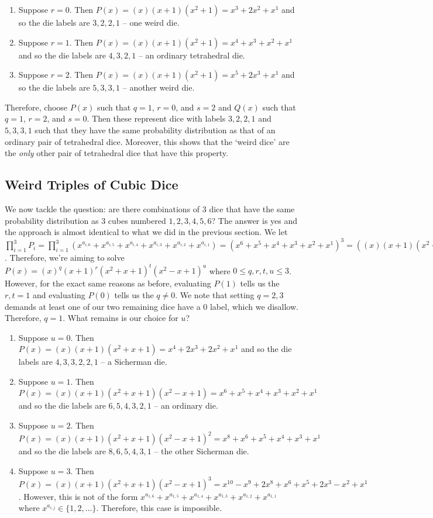 \documentclass[12pt]{report}
\begin{document}
\begin{enumerate}
\item Suppose $r=0$. Then $P(x)=(x)(x+1)(x^{2}+1)=x^{3}+2x^{2}+x^{1}$ and so the die labels are $3,2,2,1$ -- one weird die.
\item Suppose $r=1$. Then $P(x)=(x)(x+1)(x^{2}+1)=x^{4}+x^{3}+x^{2}+x^{1}$ and so the die labels are $4,3,2,1$ -- an ordinary tetrahedral die.
\item Suppose $r=2$. Then $P(x)=(x)(x+1)(x^{2}+1)=x^{5}+2x^{3}+x^{1}$ and so the die labels are $5,3,3,1$ -- another weird die.
\end{enumerate}

Therefore, choose $P(x)$ such that $q=1$, $r=0$, and $s=2$ and $Q(x)$ such that $q=1$, $r=2$, and $s=0$. Then
these represent dice with labels $3,2,2,1$ and $5,3,3,1$ such that they have the same probability distribution
as that of an ordinary pair of tetrahedral dice. Moreover, this shows that the `weird dice' are the
\textit{only} other pair of tetrahedral dice that have this property.

\subsection*{Weird Triples of Cubic Dice}
We now tackle the question: are there combinations of 3 dice that have the same probability distribution as 3
cubes numbered $1,2,3,4,5,6$? The answer is yes and the approach is almost identical to what we did in the
previous section. We let
$\prod_{i=1}^{3} P_{i}=\prod_{i=1}^{3}(x^{a_{i,6}}+x^{a_{i,5}}+x^{a_{i,4}}+x^{a_{i,3}}+x^{a_{i,2}}+x^{a_{i,1}})=(x^{6}+x^{5}+x^{4}+x^{3}+x^{2}+x^{1})^{3}=((x)(x+1)(x^{2}+x+1)(x^{2}-x+1))^{3}$.
Therefore, we're aiming to solve $P(x)=(x)^{q}(x+1)^{r}(x^{2}+x+1)^{t}(x^{2}-x+1)^{u}$ where
$0\leq q,r,t,u\leq 3$. However, for the exact same reasons as before, evaluating $P(1)$ tells us the $r,t=1$
and evaluating $P(0)$ tells us the $q \neq 0$. We note that setting $q=2,3$ demands at least one of our two
remaining dice have a 0 label, which we disallow. Therefore, $q=1$. What remains is our choice for $u$?   

\begin{enumerate}
\item Suppose $u=0$. Then $P(x)=(x)(x+1)(x^{2}+x+1)=x^{4}+2x^{3}+2x^{2}+x^{1}$ and so the die labels are $4,3,3,2,2,1$ -- a Sicherman die.
\item Suppose $u=1$. Then $P(x)=(x)(x+1)(x^{2}+x+1)(x^{2}-x+1)=x^{6}+x^{5}+x^{4}+x^{3}+x^{2}+x^{1}$ and so the die labels are $6,5,4,3,2,1$ -- an ordinary die.
\item Suppose $u=2$. Then $P(x)=(x)(x+1)(x^{2}+x+1)(x^{2}-x+1)^{2}=x^{8}+x^{6}+x^{5}+x^{4}+x^{3}+x^{1}$ and so the die labels are $8,6,5,4,3,1$ -- the other Sicherman die.
\item Suppose $u=3$. Then $P(x)=(x)(x+1)(x^{2}+x+1)(x^{2}-x+1)^{3}=x^{10}-x^{9}+2x^{8}+x^{6}+x^{5}+2x^{3}-x^{2}+x^{1}$. However, this is not of the form $x^{a_{1,6}}+x^{a_{1,5}}+x^{a_{1,4}}+x^{a_{1,3}}+x^{a_{1,2}}+x^{a_{1,1}}$ where $x^{a_{i,j}} \in \{1,2,\ldots\}$. Therefore, this case is impossible.
\end{enumerate}
\end{document}
